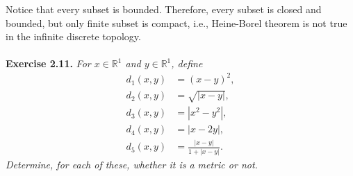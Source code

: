 \documentclass{article}
\begin{document}
Notice that every subset is bounded.
Therefore, every subset is closed and bounded,
but only finite subset is compact, i.e.,
Heine-Borel theorem is not true in the infinite discrete topology. \\\\






\textbf{Exercise 2.11.}
\emph{For $x \in \mathbb{R}^1$ and $y \in \mathbb{R}^1$, define
\begin{align*}
  d_1(x,y) &= (x-y)^2, \\
  d_2(x,y) &= \sqrt{|x-y|}, \\
  d_3(x,y) &= |x^2 - y^2|, \\
  d_4(x,y) &= |x - 2y|, \\
  d_5(x,y) &= \frac{|x-y|}{1+|x-y|}.
\end{align*}
Determine, for each of these, whether it is a metric or not.} \\
\end{document}
